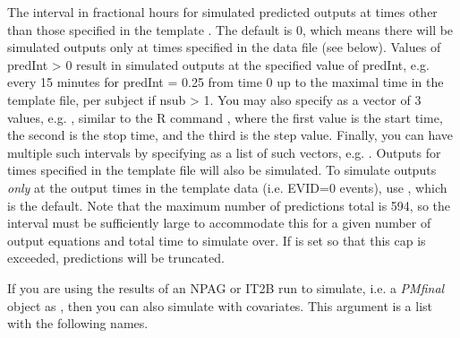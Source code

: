 \documentclass[a4paper]{book}
\begin{document}
\begin{Arguments}
\begin{ldescription}
\item[\code{predInt}] The interval in fractional hours for simulated predicted outputs at times other than those specified in the template .
The default is 0, which means there will be simulated outputs only at times specified in the data file (see below).  Values of predInt > 0 result in simulated
outputs at the specified value of predInt, e.g. every 15 minutes for predInt = 0.25 from time 0 up 
to the maximal time in the template file, per subject if nsub > 1.  You may also specify 
as a vector of 3 values, e.g. , similar to the R command , where the
first value is the start time, the second is the stop time, and the third is the
step value.  Finally, you can have multiple such intervals by specifying  as a list of such
vectors, e.g. .  Outputs for times specified in the template file will also be simulated.
To simulate outputs \emph{only} at the output times in the template data (i.e. EVID=0 events), use , which is the default.
Note that the maximum number of predictions total is 594, so the interval must be sufficiently large to accommodate this for a given
number of output equations and total time to simulate over.  If  is set so that this cap is exceeded, predictions will be truncated.

\item[\code{covariate}] If you are using the results of an NPAG or IT2B run to simulate, i.e. a \emph{PMfinal} object as , 
then you can also simulate with covariates. This argument is a list with the following names.
\begin{itemize}


\end{itemize}
\end{ldescription}
\end{Arguments}
\end{document}
